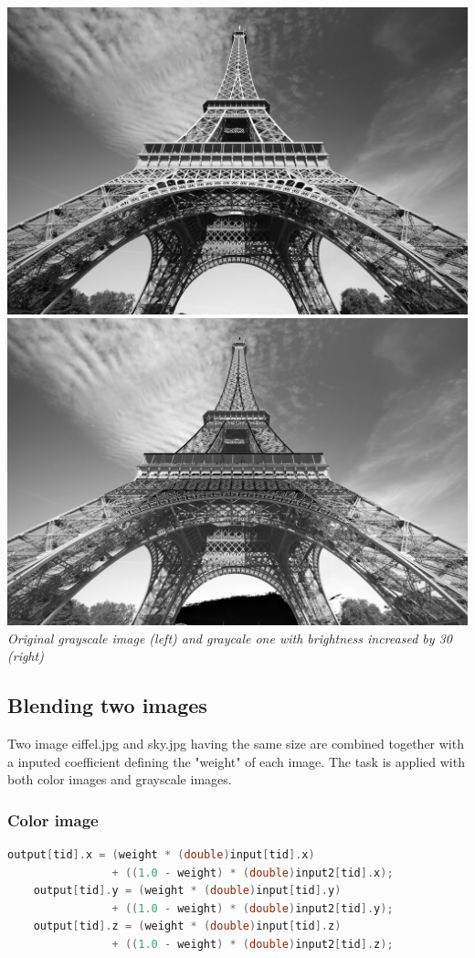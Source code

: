 \documentclass{article}
\begin{document}
\includegraphics[scale=0.045]{eiffelGray.jpg}
\includegraphics[scale=0.045]{brightness.jpg}\\
\textit{Original grayscale image (left) and graycale one with brightness increased by 30 (right)}

\subsection{Blending two images}
Two image eiffel.jpg and sky.jpg having the same size are combined together with a inputed coefficient defining the "weight" of each image. The task is applied with both color images and grayscale images.
\subsubsection{Color image}
\begin{lstlisting}[language=C]
    output[tid].x = (weight * (double)input[tid].x) 
                + ((1.0 - weight) * (double)input2[tid].x);
    output[tid].y = (weight * (double)input[tid].y) 
                + ((1.0 - weight) * (double)input2[tid].y);
    output[tid].z = (weight * (double)input[tid].z) 
                + ((1.0 - weight) * (double)input2[tid].z);
\end{lstlisting}
\end{document}
